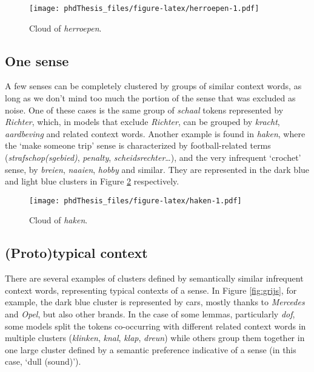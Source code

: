 \documentclass[
]{book}
\begin{document}
\begin{figure}
\centering
\texttt{[image: phdThesis\_files/figure-latex/herroepen-1.pdf]}
\caption{\label{fig:herroepen}Cloud of \emph{herroepen}.}
\end{figure}

\hypertarget{one-sense-1}{%
\subsection{One sense}\label{one-sense-1}}

A few senses can be completely clustered by groups of similar context words, as long as we don't mind too much the portion of the sense that was excluded as noise. One of these cases is the same group of \emph{schaal} tokens represented by \emph{Richter}, which, in models that exclude \emph{Richter}, can be grouped by \emph{kracht}, \emph{aardbeving} and related context words. Another example is found in \emph{haken}, where the `make someone trip' sense is characterized by football-related terms (\emph{strafschop(sgebied)}, \emph{penalty}, \emph{scheidsrechter}\ldots), and the very infrequent `crochet' sense, by \emph{breien}, \emph{naaien}, \emph{hobby} and similar. They are represented in the dark blue and light blue clusters in Figure \ref{fig:haken} respectively.



\begin{figure}
\centering
\texttt{[image: phdThesis\_files/figure-latex/haken-1.pdf]}
\caption{\label{fig:haken}Cloud of \emph{haken}.}
\end{figure}

\hypertarget{prototypical-context-2}{%
\subsection{(Proto)typical context}\label{prototypical-context-2}}

There are several examples of clusters defined by semantically similar infrequent context words, representing typical contexts of a sense. In Figure \ref{fig:grijs}, for example, the dark blue cluster is represented by cars, mostly thanks to \emph{Mercedes} and \emph{Opel}, but also other brands. In the case of some lemmas, particularly \emph{dof}, some models split the tokens co-occurring with different related context words in multiple clusters (\emph{klinken}, \emph{knal}, \emph{klap}, \emph{dreun}) while others group them together in one large cluster defined by a semantic preference indicative of a sense (in this case, `dull (sound)').
\end{document}
